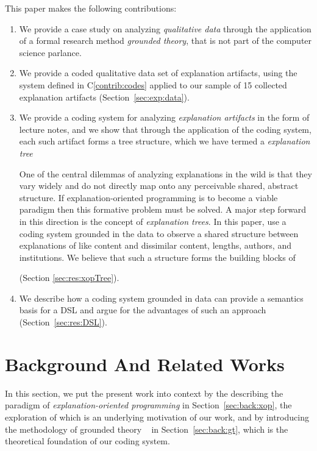 \documentclass[sigconf]{acmart}
\begin{document}
This paper makes the following contributions:
%
\begin{enumerate}[C1.]

\item \label{contrib:method}
  We provide a case study on analyzing \emph{qualitative data} through the
  application of a formal research method \emph{grounded theory}, that is not
  part of the computer science parlance.

\item \label{contrib:data}
%
We provide a coded qualitative data set of explanation artifacts, using the
system defined in C\ref{contrib:codes} applied to our sample of 15 collected
explanation artifacts (Section~\ref{sec:exp:data}).

\item \label{contrib:codes}
%
We provide a coding system for analyzing \emph{explanation artifacts} in the
form of lecture notes, and we show that through the application of the coding
system, each such artifact forms a tree structure, which we have termed a
\emph{explanation tree}

 One of the central dilemmas of analyzing explanations in the
wild is that they vary widely and do not directly map onto any perceivable
shared, abstract structure. If explanation-oriented programming is to become a
viable paradigm then this formative problem must be solved. A major step forward
in this direction is the concept of \emph{explanation trees}. In this paper, use
a coding system grounded in the data to observe a shared structure between
explanations of like content and dissimilar content, lengths, authors, and
institutions. We believe that such a structure forms the building blocks of

(Section \ref{sec:res:xopTree}).


\item \label{contrib:DSL}
%
  We describe how a coding system grounded in data can provide a
  semantics basis for a DSL and argue for the advantages of such an approach
  (Section~\ref{sec:res:DSL}).
%
\end{enumerate}

\noindent

\section{Background And Related Works}
\label{sec:back}

In this section, we put the present work into context by the describing the
paradigm of \emph{explanation-oriented programming} in
Section~\ref{sec:back:xop}, the exploration of which is an underlying
motivation of our work, and by introducing the methodology of grounded theory
~\cite{Strauss67discoveryof} in Section~\ref{sec:back:gt}, which is the
theoretical foundation of our coding system.
\end{document}
